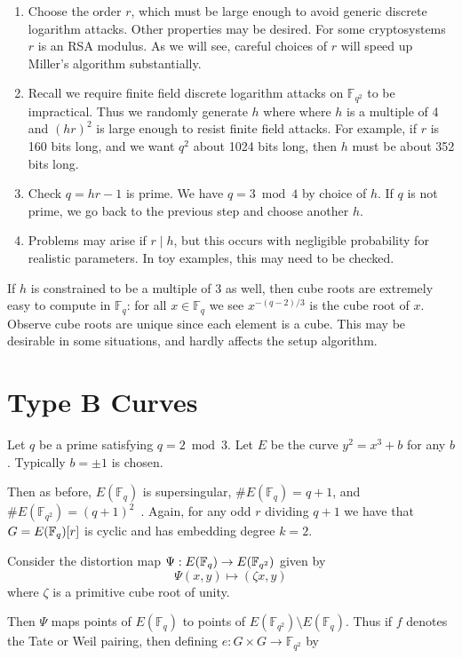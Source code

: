 \begin{enumerate}
\item
Choose the order $r$, which must be large enough to avoid generic discrete
logarithm attacks. Other properties may be desired. For some cryptosystems $r$
is an RSA modulus. As we will see, careful choices of $r$ will speed up
Miller's algorithm substantially.
\item
Recall we require finite field discrete logarithm attacks on $\mathbb{F}_{q^2}$
to be impractical. Thus we randomly generate $h$ where
where $h$ is a multiple of 4 and $(hr)^2$ is large enough to resist
finite field attacks. For example, if $r$ is 160 bits long, and we want
$q^2$ about 1024 bits long, then $h$ must be about 352 bits long.
\item
Check $q = h r - 1$ is prime. We have $q = 3 \bmod 4$ by choice of $h$.
If $q$ is not prime, we go back to the previous step and choose another
$h$.
\item
Problems may arise if $r \mid h$, but this occurs
with negligible probability for realistic parameters. In toy examples,
this may need to be checked.
\end{enumerate}

If $h$ is constrained to be a multiple of $3$ as well, then cube roots are
extremely easy to compute in $\mathbb{F}_{q}$:
for all $x \in \mathbb{F}_q$ we see $x^{-(q-2)/3}$ is the cube root of $x$.
Observe cube roots are unique since each element is a cube.
This may be desirable in some situations, and hardly affects the setup
algorithm.

\section {\label{sec:typeb}Type B Curves}

Let $q$ be a prime satisfying $q = 2 \bmod 3$.
Let $E$ be the curve $y^2 = x^3 + b$ for any $b$. Typically $b=\pm1$ is
chosen.

Then as before,
$E(\mathbb{F}_q)$ is supersingular,
$\#E(\mathbb{F}_q) = q+1$, and
$\#E(\mathbb{F}_{q^2}) = (q+1)^2$~\cite[\S 3.2]{fst}.
Again, for any odd $r$ dividing $q + 1$ we have that
$G = E(\mathbb{F}_q)[r]$ is cyclic and has embedding degree $k = 2$.

Consider the distortion map $\Psi:E(\mathbb{F}_q)\rightarrow E(\mathbb{F}_{q^2})$ given by
\[ \Psi(x, y) \mapsto (\zeta x, y) \]
where $\zeta$ is a primitive cube root of unity.

Then $\Psi$ maps points of $E(\mathbb{F}_q)$ to points of
$E(\mathbb{F}_{q^2}) \setminus E(\mathbb{F}_q)$. Thus if $f$ denotes the
Tate or Weil pairing, then defining $e:G \times G \rightarrow \mathbb{F}_{q^2}$
by

